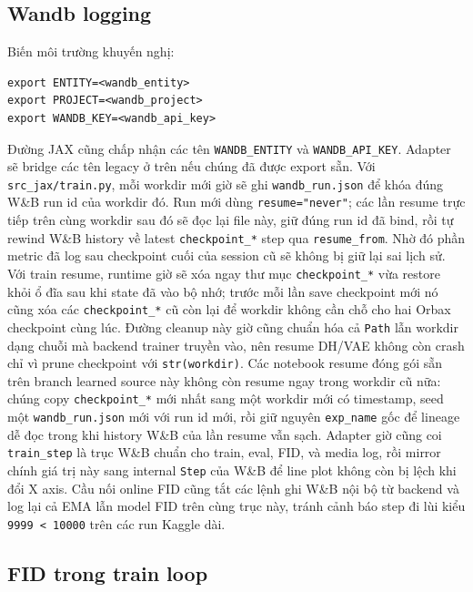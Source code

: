 \subsection{Wandb logging}

Biến môi trường khuyến nghị:

\begin{lstlisting}[style=rae]
export ENTITY=<wandb_entity>
export PROJECT=<wandb_project>
export WANDB_KEY=<wandb_api_key>
\end{lstlisting}

Đường JAX cũng chấp nhận các tên \texttt{WANDB\_ENTITY} và
\texttt{WANDB\_API\_KEY}. Adapter sẽ bridge các tên legacy ở trên nếu chúng đã
được export sẵn. Với \texttt{src\_jax/train.py}, mỗi workdir mới giờ sẽ ghi
\texttt{wandb\_run.json} để khóa đúng W\&B run id của workdir đó. Run mới dùng
\texttt{resume="never"}; các lần resume trực tiếp trên cùng workdir sau đó sẽ
đọc lại file này, giữ đúng run id đã bind, rồi tự rewind W\&B history về
latest \texttt{checkpoint\_*} step qua \texttt{resume\_from}. Nhờ đó phần
metric đã log sau checkpoint cuối của session cũ sẽ không bị giữ lại sai lịch
sử. Với train resume, runtime giờ sẽ xóa ngay thư mục \texttt{checkpoint\_*}
vừa restore khỏi ổ đĩa sau khi state đã vào bộ nhớ; trước mỗi lần save
checkpoint mới nó cũng xóa các \texttt{checkpoint\_*} cũ còn lại để workdir
không cần chỗ cho hai Orbax checkpoint cùng lúc. Đường cleanup này giờ cũng
chuẩn hóa cả \texttt{Path} lẫn workdir dạng chuỗi mà backend trainer truyền
vào, nên resume DH/VAE không còn crash chỉ vì prune checkpoint với
\texttt{str(workdir)}. Các notebook resume đóng gói sẵn trên branch learned
source này không còn resume ngay trong workdir cũ nữa: chúng copy
\texttt{checkpoint\_*} mới nhất sang một workdir mới có timestamp, seed một
\texttt{wandb\_run.json} mới với run id mới, rồi giữ nguyên \texttt{exp\_name}
gốc để lineage dễ đọc trong khi history W\&B của lần resume vẫn sạch. Adapter
giờ cũng coi \texttt{train\_step} là trục W\&B chuẩn cho train, eval, FID, và
media log, rồi mirror chính giá trị này sang internal \texttt{Step} của W\&B
để line plot không còn bị lệch khi đổi X axis. Cầu nối online FID cũng tắt các
lệnh ghi W\&B nội bộ từ backend và log lại cả EMA lẫn model FID trên cùng trục
này, tránh cảnh báo step đi lùi kiểu \texttt{9999 < 10000} trên các run Kaggle
dài.

\subsection{FID trong train loop}

